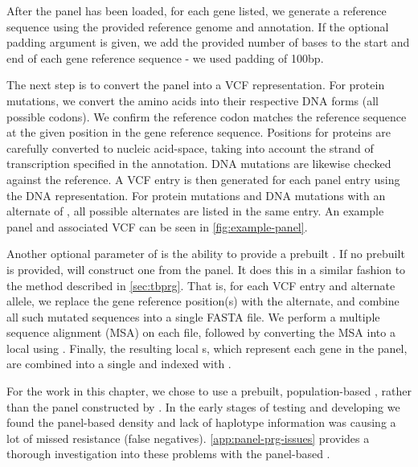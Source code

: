 After the panel has been loaded, for each gene listed, we generate a reference sequence using the provided reference genome and annotation. If the optional padding argument is given, we add the provided number of bases to the start and end of each gene reference sequence - we used padding of 100bp.

The next step is to convert the panel into a VCF representation. For protein mutations, we convert the amino acids into their respective DNA forms (all possible codons). We confirm the reference codon matches the reference sequence at the given position in the gene reference sequence. Positions for proteins are carefully converted to nucleic acid-space, taking into account the strand of transcription specified in the annotation. DNA mutations are likewise checked against the reference. A VCF entry is then generated for each panel entry using the DNA representation. For protein mutations and DNA mutations with an alternate of , all possible alternates are listed in the same entry. An example panel and associated VCF can be seen in \autoref{fig:example-panel}.

Another optional parameter of \drprg{}  is the ability to provide a prebuilt \prg{}. If no prebuilt \prg{} is provided, \drprg{} will construct one from the panel. It does this in a similar fashion to the method described in \autoref{sec:tbprg}. That is, for each VCF entry and alternate allele, we replace the gene reference position(s) with the alternate, and combine all such mutated sequences into a single FASTA file. We perform a multiple sequence alignment (MSA) on each file, followed by converting the MSA into a local \prg{} using \makeprg{}. Finally, the resulting local \prg{}s, which represent each gene in the panel, are combined into a single \prg{} and indexed with \pandora{}.

For the work in this chapter, we chose to use a prebuilt, population-based \prg{}, rather than the panel \prg{} constructed by \drprg{}. In the early stages of testing and developing \drprg{} we found the panel-based \prg{} density and lack of haplotype information was causing a lot of missed resistance (false negatives). \autoref{app:panel-prg-issues} provides a thorough investigation into these problems with the panel-based \prg{}.

